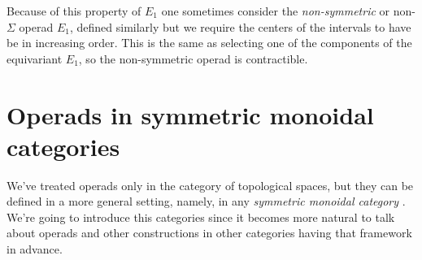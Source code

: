 \documentclass[TFM.tex]{subfiles}
\begin{document}
Because of this property of $E_1$ one sometimes consider the \emph{non-symmetric} or non-$\Sigma$ operad $E_1$, defined similarly but we require the centers of the intervals to have be in increasing order. This is the same as selecting one of the components of the equivariant $E_1$, so the non-symmetric operad is contractible. 







\section{Operads in symmetric monoidal categories}
We've treated operads only in the category of topological spaces, but they can be defined in a more general setting, namely, in any \emph{symmetric monoidal category} \cite{Yau}. We're going to introduce this categories since it becomes more natural to talk about operads and other constructions in other categories having that framework in advance.
\end{document}
